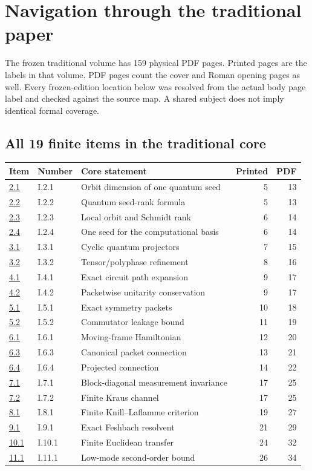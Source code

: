 \section{Navigation through the traditional paper}
\label{sec:traditional-navigation}
The frozen traditional volume has 159 physical PDF pages. Printed pages are the labels in that volume. PDF pages count the cover and Roman opening pages as well. Every frozen-edition location below was resolved from the actual body page label and checked against the source map. A shared subject does not imply identical formal coverage.

\subsection{All 19 finite items in the traditional core}
\begin{longtable}{@{}p{.10\linewidth}p{.13\linewidth}p{.49\linewidth}rr@{}}\toprule Item & Number & Core statement & Printed & PDF\\\midrule\endhead
\hyperref[result:2.1]{2.1} & I.2.1 & Orbit dimension of one quantum seed & 5 & 13\\
\hyperref[result:2.2]{2.2} & I.2.2 & Quantum seed-rank formula & 5 & 13\\
\hyperref[result:2.3]{2.3} & I.2.3 & Local orbit and Schmidt rank & 6 & 14\\
\hyperref[result:2.4]{2.4} & I.2.4 & One seed for the computational basis & 6 & 14\\
\hyperref[result:3.1]{3.1} & I.3.1 & Cyclic quantum projectors & 7 & 15\\
\hyperref[result:3.2]{3.2} & I.3.2 & Tensor/polyphase refinement & 8 & 16\\
\hyperref[result:4.1]{4.1} & I.4.1 & Exact circuit path expansion & 9 & 17\\
\hyperref[result:4.2]{4.2} & I.4.2 & Packetwise unitarity conservation & 9 & 17\\
\hyperref[result:5.1]{5.1} & I.5.1 & Exact symmetry packets & 10 & 18\\
\hyperref[result:5.2]{5.2} & I.5.2 & Commutator leakage bound & 11 & 19\\
\hyperref[result:6.1]{6.1} & I.6.1 & Moving-frame Hamiltonian & 12 & 20\\
\hyperref[result:6.3]{6.3} & I.6.3 & Canonical packet connection & 13 & 21\\
\hyperref[result:6.4]{6.4} & I.6.4 & Projected connection & 14 & 22\\
\hyperref[result:7.1]{7.1} & I.7.1 & Block-diagonal measurement invariance & 17 & 25\\
\hyperref[result:7.2]{7.2} & I.7.2 & Finite Kraus channel & 17 & 25\\
\hyperref[result:8.1]{8.1} & I.8.1 & Finite Knill--Laflamme criterion & 19 & 27\\
\hyperref[result:9.1]{9.1} & I.9.1 & Exact Feshbach resolvent & 21 & 29\\
\hyperref[result:10.1]{10.1} & I.10.1 & Finite Euclidean transfer & 24 & 32\\
\hyperref[result:11.1]{11.1} & I.11.1 & Low-mode second-order bound & 26 & 34\\
\bottomrule\end{longtable}
